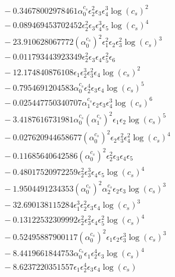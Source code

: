 \documentclass[10pt]{article}
\begin{document}
\begin{align*}
&{}  - 0.34678002978461 \alpha_{0}^{c_s} \epsilon_{2}^{2} \epsilon_{3} \epsilon_{4}^{3} \log{\left(c_{s} \right)}^{2} \\
&{}  - 0.089469453702452 \epsilon_{2}^{2} \epsilon_{3} \epsilon_{4}^{3} \epsilon_{5} \log{\left(c_{s} \right)}^{4} \\
&{}  - 23.910628067772 \left(\alpha_{0}^{c_s}\right)^{2} \epsilon_{1}^{2} \epsilon_{2} \epsilon_{3}^{2} \log{\left(c_{s} \right)}^{3} \\
&{}  - 0.011793443923349 \epsilon_{2}^{2} \epsilon_{3} \epsilon_{4} \epsilon_{5}^{2} \epsilon_{6} \\
&{}  - 12.174840876108 \epsilon_{1} \epsilon_{2}^{3} \epsilon_{3}^{2} \epsilon_{4} \log{\left(c_{s} \right)}^{2} \\
&{}  - 0.7954691204583 \alpha_{0}^{c_s} \epsilon_{2}^{4} \epsilon_{3} \epsilon_{4} \log{\left(c_{s} \right)}^{5} \\
&{}  - 0.025447750340707 \alpha_{1}^{c_s} \epsilon_{2} \epsilon_{3} \epsilon_{4}^{3} \log{\left(c_{s} \right)}^{6} \\
&{}  - 3.4187616731981 \alpha_{0}^{c_s} \left(\alpha_{1}^{c_s}\right)^{2} \epsilon_{1} \epsilon_{2} \log{\left(c_{s} \right)}^{5} \\
&{}  - 0.027620944658677 \left(\alpha_{0}^{c_s}\right)^{2} \epsilon_{2} \epsilon_{3}^{2} \epsilon_{4}^{2} \log{\left(c_{s} \right)}^{4} \\
&{}  - 0.11685640642586 \left(\alpha_{0}^{c_s}\right)^{2} \epsilon_{2}^{2} \epsilon_{3} \epsilon_{4} \epsilon_{5} \\
&{}  - 0.48017520972259 \epsilon_{2}^{2} \epsilon_{3}^{3} \epsilon_{4} \epsilon_{5} \log{\left(c_{s} \right)}^{4} \\
&{}  - 1.9504491234353 \left(\alpha_{0}^{c_s}\right)^{2} \alpha_{2}^{c_s} \epsilon_{2} \epsilon_{3} \log{\left(c_{s} \right)}^{3} \\
&{}  - 32.690138115284 \epsilon_{1}^{3} \epsilon_{2}^{2} \epsilon_{3} \epsilon_{4} \log{\left(c_{s} \right)}^{3} \\
&{}  - 0.13122532309992 \epsilon_{2}^{2} \epsilon_{3}^{2} \epsilon_{4} \epsilon_{5}^{2} \log{\left(c_{s} \right)}^{4} \\
&{}  - 0.52495887900117 \left(\alpha_{0}^{c_s}\right)^{2} \epsilon_{1} \epsilon_{2} \epsilon_{3}^{3} \log{\left(c_{s} \right)}^{3} \\
&{}  - 8.4419661844753 \alpha_{0}^{c_s} \epsilon_{1} \epsilon_{2}^{4} \epsilon_{3} \log{\left(c_{s} \right)}^{4} \\
&{}  - 8.6237220351557 \epsilon_{1} \epsilon_{2}^{4} \epsilon_{3} \epsilon_{4} \log{\left(c_{s} \right)} \\

\end{align*}
\end{document}
